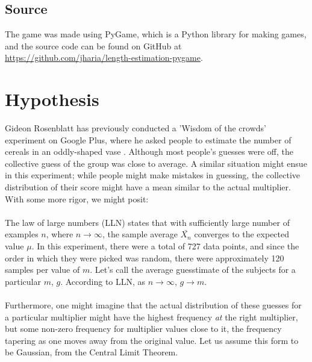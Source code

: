\documentclass[12pt]{article}
\begin{document}
\subsection{Source}
The game was made using PyGame, which is a Python library for making games, and the source code can be found on GitHub at \url{https://github.com/jharia/length-estimation-pygame}.  

\section{Hypothesis}\label{hypothesis}
Gideon Rosenblatt has previously conducted a 'Wisdom of the crowds' experiment on Google Plus, where he asked people to estimate the number of cereals in an oddly-shaped vase \cite{online experiment}. Although most people's guesses were off, the collective guess of the group was close to average. A similar situation might ensue in this experiment; while people might make mistakes in guessing, the collective distribution of their score might have a mean similar to the actual multiplier.  With some more rigor, we might posit: 
\\\\The law of large numbers (LLN) states that with sufficiently large number of examples $n$, where $n\to\infty$, the sample average $\bar{X_n}$ converges to the expected value $\mu$. In this experiment, there were a total of 727 data points, and since the order in which they were picked was random, there were approximately 120 samples per value of $m$. Let's call the average guesstimate of the subjects for a particular $m$, $g$. According to LLN, as $n\to\infty$, $g \to m$.
\\\\Furthermore, one might imagine that the actual distribution of these guesses for a particular multiplier might have the highest frequency \emph{at} the right multiplier, but some non-zero frequency for multiplier values close to it, the frequency tapering as one moves away from the original value. Let us assume this form to be Gaussian, from the Central Limit Theorem. 
\end{document}
